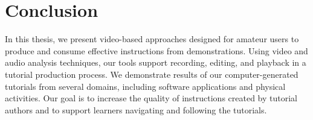 \section{Conclusion}

In this thesis, we present video-based approaches designed for amateur users to produce and consume effective instructions from demonstrations. Using video and audio analysis techniques, our tools support recording, editing, and playback in a tutorial production process. We demonstrate results of our computer-generated tutorials from several domains, including software applications and physical activities. Our goal is to increase the quality of instructions created by tutorial authors and to support learners navigating and following the tutorials.

